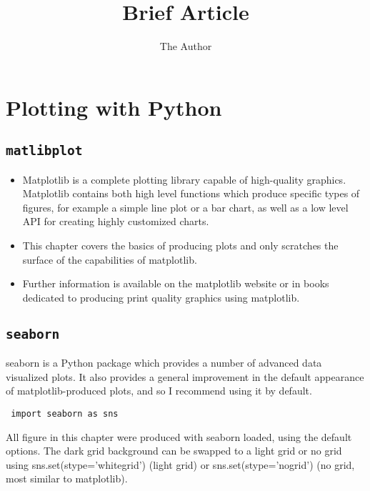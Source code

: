 \documentclass[11pt]{article} %
\title{Brief Article}
\author{The Author}
\begin{document}
\section{Plotting with Python}

\subsection{\texttt{matlibplot}}
\begin{itemize}
\item Matplotlib is a complete plotting library capable of high-quality graphics. Matplotlib contains both high level functions which produce specific types of figures, for example a simple line plot or a bar chart, as
well as a low level API for creating highly customized charts. 

\item This chapter covers the basics of producing
plots and only scratches the surface of the capabilities of matplotlib. 
\item Further information is available on
the matplotlib website or in books dedicated to producing print quality graphics using matplotlib.
\end{itemize}
\subsection{\texttt{seaborn}}

seaborn is a Python package which provides a number of advanced data visualized plots. It also provides a
general improvement in the default appearance of matplotlib-produced plots, and so I recommend using
it by default.

\begin{framed}
\begin{verbatim}
 import seaborn as sns

\end{verbatim}
\end{framed}
All figure in this chapter were produced with seaborn loaded, using the default options. The dark grid
background can be swapped to a light grid or no grid using sns.set(stype=’whitegrid’) (light grid) or
sns.set(stype=’nogrid’) (no grid, most similar to matplotlib).
\end{document}
